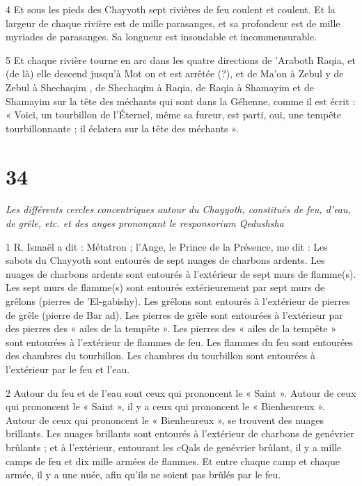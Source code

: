 \par 4 Et sous les pieds des Chayyoth sept rivières de feu coulent et coulent. Et la largeur de chaque rivière est de mille parasanges, et sa profondeur est de mille myriades de parasanges. Sa longueur est insondable et incommensurable.

\par 5 Et chaque rivière tourne en arc dans les quatre directions de 'Araboth Raqia, et (de là) elle descend jusqu'à Mot on et est arrêtée (?), et de Ma'on à Zebul y de Zebul à Shechaqim , de Shechaqim à Raqia, de Raqia à Shamayim et de Shamayim sur la tête des méchants qui sont dans la Géhenne, comme il est écrit : « Voici, un tourbillon de l'Éternel, même sa fureur, est parti, oui, une tempête tourbillonnante ; il éclatera sur la tête des méchants ».

\chapter{34}

\par \textit{Les différents cercles concentriques autour du Chayyoth, constitués de feu, d'eau, de grêle, etc. et des anges prononçant le responsorium Qedushsha}

\par 1 R. Ismaël a dit : Métatron ; l'Ange, le Prince de la Présence, me dit : Les sabots du Chayyoth sont entourés de sept nuages ​​de charbons ardents. Les nuages ​​de charbons ardents sont entourés à l’extérieur de sept murs de flamme(s). Les sept murs de flamme(s) sont entourés extérieurement par sept murs de grêlons (pierres de 'El-gabishy). Les grêlons sont entourés à l'extérieur de pierres de grêle (pierre de Bar ad). Les pierres de grêle sont entourées à l'extérieur par des pierres des « ailes de la tempête ». Les pierres des « ailes de la tempête » sont entourées à l’extérieur de flammes de feu. Les flammes du feu sont entourées des chambres du tourbillon. Les chambres du tourbillon sont entourées à l’extérieur par le feu et l’eau.

\par 2 Autour du feu et de l'eau sont ceux qui prononcent le « Saint ». Autour de ceux qui prononcent le « Saint », il y a ceux qui prononcent le « Bienheureux ». Autour de ceux qui prononcent le « Bienheureux », se trouvent des nuages ​​brillants. Les nuages ​​brillants sont entourés à l'extérieur de charbons de genévrier brûlants ; et à l'extérieur, entourant les cQals de genévrier brûlant, il y a mille camps de feu et dix mille armées de flammes. Et entre chaque camp et chaque armée, il y a une nuée, afin qu'ils ne soient pas brûlés par le feu.

